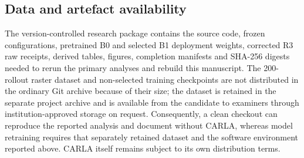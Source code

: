 \subsection{Data and artefact availability}

The version-controlled research package contains the source code, frozen
configurations, pretrained B0 and selected B1 deployment weights, corrected R3
raw receipts, derived tables, figures, completion manifests and SHA-256
digests needed to rerun the primary analyses and rebuild this manuscript.
The 200-rollout raster dataset and non-selected training checkpoints are not
distributed in the ordinary Git archive because of their size; the dataset is
retained in the separate project archive and is available from the candidate
to examiners through institution-approved storage on request. Consequently, a
clean checkout can reproduce the reported analysis and document without CARLA,
whereas model retraining requires that separately retained dataset and the
software environment reported above. CARLA itself remains subject to its own
distribution terms.
